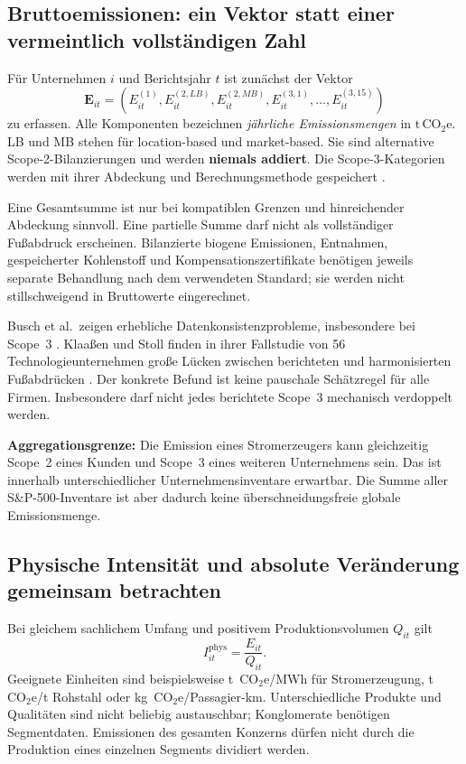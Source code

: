 \documentclass[11pt,a4paper]{article}
\newcommand{\coeq}{\ensuremath{\mathrm{CO}_{2}\mathrm{e}}}
\newcommand{\tonnen}{\ensuremath{\mathrm{t\,CO}_{2}\mathrm{e}}}
\begin{document}
\subsection{Bruttoemissionen: ein Vektor statt einer vermeintlich vollständigen Zahl}
Für Unternehmen $i$ und Berichtsjahr $t$ ist zunächst der Vektor
\begin{equation}
\mathbf E_{it}=\left(E^{(1)}_{it},E^{(2,LB)}_{it},E^{(2,MB)}_{it},E^{(3,1)}_{it},\ldots,E^{(3,15)}_{it}\right)
\end{equation}
zu erfassen. Alle Komponenten bezeichnen \emph{jährliche Emissionsmengen} in \tonnen. LB und MB stehen für location-based und market-based. Sie sind alternative Scope-2-Bilanzierungen und werden \textbf{niemals addiert}. Die Scope-3-Kategorien werden mit ihrer Abdeckung und Berechnungsmethode gespeichert \cite{ghgcorporate,ghgscope2,ghgscope3}.

Eine Gesamtsumme ist nur bei kompatiblen Grenzen und hinreichender Abdeckung sinnvoll. Eine partielle Summe darf nicht als vollständiger Fußabdruck erscheinen. Bilanzierte biogene Emissionen, Entnahmen, gespeicherter Kohlenstoff und Kompensationszertifikate benötigen jeweils separate Behandlung nach dem verwendeten Standard; sie werden nicht stillschweigend in Bruttowerte eingerechnet.

Busch et al.\ zeigen erhebliche Datenkonsistenzprobleme, insbesondere bei Scope~3 \cite{busch2022}. Klaaßen und Stoll finden in ihrer Fallstudie von 56 Technologieunternehmen große Lücken zwischen berichteten und harmonisierten Fußabdrücken \cite{klaassen2021}. Der konkrete Befund ist keine pauschale Schätzregel für alle Firmen. Insbesondere darf nicht jedes berichtete Scope~3 mechanisch verdoppelt werden.

\textbf{Aggregationsgrenze:} Die Emission eines Stromerzeugers kann gleichzeitig Scope~2 eines Kunden und Scope~3 eines weiteren Unternehmens sein. Das ist innerhalb unterschiedlicher Unternehmensinventare erwartbar. Die Summe aller S\&P-500-Inventare ist aber dadurch keine überschneidungsfreie globale Emissionsmenge.

\subsection{Physische Intensität und absolute Veränderung gemeinsam betrachten}
Bei gleichem sachlichem Umfang und positivem Produktionsvolumen $Q_{it}$ gilt
\begin{equation}
I^{\mathrm{phys}}_{it}=\frac{E_{it}}{Q_{it}}.
\end{equation}
Geeignete Einheiten sind beispielsweise t~\coeq/MWh für Stromerzeugung, t~\coeq/t Rohstahl oder kg~\coeq/Passagier-km. Unterschiedliche Produkte und Qualitäten sind nicht beliebig austauschbar; Konglomerate benötigen Segmentdaten. Emissionen des gesamten Konzerns dürfen nicht durch die Produktion eines einzelnen Segments dividiert werden.
\end{document}
